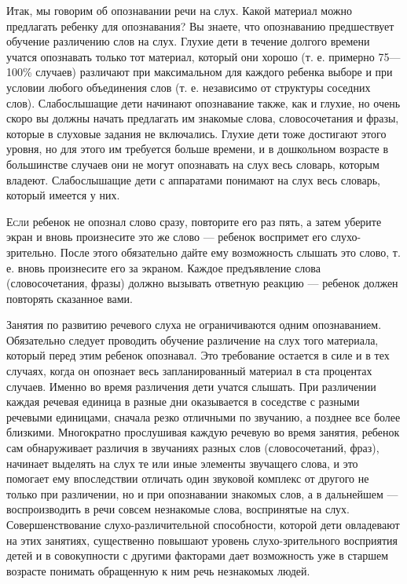 \documentclass{book}
\begin{document}
Итак, мы говорим об опознавании речи на слух. Какой материал можно
предлагать ребенку для опознавания? Вы знаете, что опознаванию
предшествует обучение различению слов на слух. Глухие дети в течение
долгого времени учатся опознавать только тот материал, который они
хорошо (т. е. примерно 75---100\% случаев) различают при максимальном
для каждого ребенка выборе и при условии любого объединения слов (т. е.
независимо от структуры соседних слов). Слабослышащие дети начинают
опознавание также, как и глухие, но очень скоро вы должны начать
предлагать им знакомые слова, словосочетания и фразы, которые в слуховые
задания не включались. Глухие дети тоже достигают этого уровня, но для
этого им требуется больше времени, и в дошкольном возрасте в большинстве
случаев они не могут опознавать на слух весь словарь, которым владеют.
Слабослышащие дети с аппаратами понимают на слух весь словарь, который
имеется у них.

\textsc{Если} ребенок не опознал слово сразу, повторите его раз пять, а
затем уберите экран и вновь произнесите это же слово --- ребенок
воспримет его слухо-зрительно. После этого обязательно дайте ему
возможность слышать это слово, т. е. вновь произнесите его за экраном.
Каждое предъявление слова (словосочетания, фразы) должно вызывать
ответную реакцию --- ребенок должен повторять сказанное вами.

Занятия по развитию речевого слуха не ограничиваются одним опознаванием.
Обязательно следует проводить обучение различение на слух того
материала, который перед этим ребенок опознавал. Это требование остается
в силе и в тех случаях, когда он опознает весь запланированный материал
в ста процентах случаев. Именно во время различения дети учатся слышать.
При различении каждая речевая единица в разные дни оказывается в
соседстве с разными речевыми единицами, сначала резко отличными по
звучанию, а позднее все более близкими. Многократно прослушивая каждую
речевую во время занятия, ребенок сам обнаруживает различия в звучаниях
разных слов (словосочетаний, фраз), начинает выделять на слух те или
иные элементы звучащего слова, и это помогает ему впоследствии отличать
один звуковой комплекс от другого не только при различении, но и при
опознавании знакомых слов, а в дальнейшем --- воспроизводить в речи
совсем незнакомые слова, воспринятые на слух. Совершенствование
слухо-различительной способности, которой дети овладевают на этих
занятиях, существенно повышают уровень слухо-зрительного восприятия
детей и в совокупности с другими факторами дает возможность уже в
старшем возрасте понимать обращенную к ним речь незнакомых людей.
\end{document}
